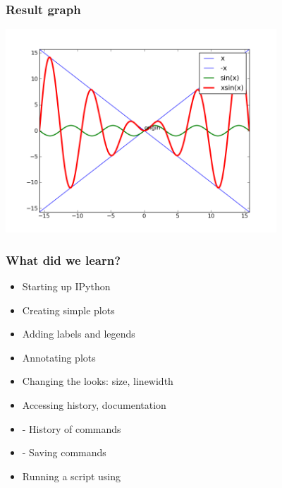 \documentclass[14pt,compress]{beamer}
\newcounter{time}
\newcommand{\inctime}[1]{\addtocounter{time}{#1}{\tiny \thetime\ m}}
\newcommand{\kwrd}[1]{ \texttt{\textbf{\color{blue}{#1}}}  }
\begin{document}
\begin{frame}[fragile]
  \frametitle{Result graph}
  \begin{center}
    \includegraphics[height=3in, interpolate=true]{data/four_plot}
  \end{center}
\end{frame}

\begin{frame}[fragile]
  \frametitle{What did we learn?}
  \begin{itemize}
    \item Starting up IPython
    \item Creating simple plots
    \item Adding labels and legends
    \item Annotating plots
    \item Changing the looks: size, linewidth
    \item Accessing history, documentation
    \item \kwrd{\%hist} - History of commands
    \item \kwrd{\%save} - Saving commands 
    \item Running a script using \kwrd{\%run -i}
  \end{itemize}
  \inctime{30}
\end{frame}
\end{document}
